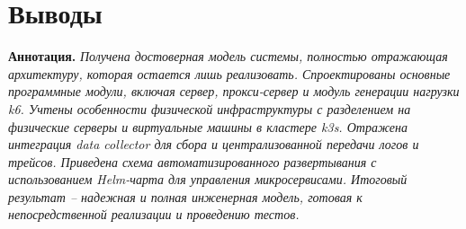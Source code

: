 \section{Выводы}

\textbf{Аннотация.} \textit{Получена достоверная модель системы, полностью отражающая архитектуру, которая остается лишь реализовать. Спроектированы основные программные модули, включая сервер, прокси-сервер и модуль генерации нагрузки k6. Учтены особенности физической инфраструктуры с разделением на физические серверы и виртуальные машины в кластере k3s. Отражена интеграция data collector для сбора и централизованной передачи логов и трейсов. Приведена схема автоматизированного развертывания с использованием Helm-чарта для управления микросервисами. Итоговый результат – надежная и полная инженерная модель, готовая к непосредственной реализации и проведению тестов.}

